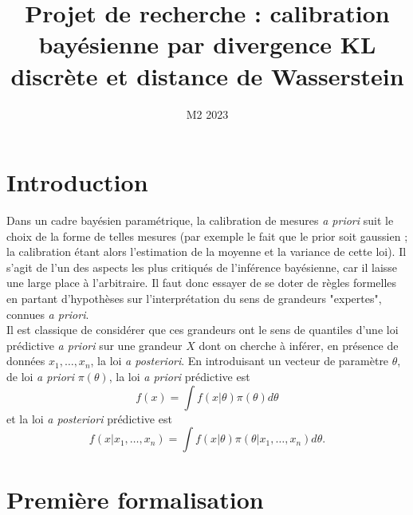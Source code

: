 \documentclass[10pt]{article}
\title{Projet de recherche : calibration bay\'esienne par divergence KL discr\`ete et distance de Wasserstein}
\date{M2 2023}
\newcommand{\1}{\mathbbm{1}}
\begin{document}
\maketitle

 
\section{Introduction}

Dans un cadre bay\'esien param\'etrique, la calibration de mesures {\it a priori} suit le choix de la forme de telles mesures (par exemple le fait que le prior soit gaussien ; la calibration \'etant alors l'estimation de la moyenne et la variance de cette loi). Il s'agit de l'un des aspects les plus critiqu\'es de l'inf\'erence bay\'esienne, car il laisse une large place \`a l'arbitraire. Il faut donc essayer de se doter de r\`egles formelles en partant d'hypoth\`eses sur l'interpr\'etation du sens de grandeurs "expertes", connues {\it a priori}. \\

Il est classique de consid\'erer que ces grandeurs ont le sens de quantiles d'une loi pr\'edictive {\it a priori} sur une grandeur $X$ dont on cherche \`a inf\'erer, en pr\'esence de donn\'ees $x_1,\ldots,x_n$, la loi {\it a posteriori}. En introduisant un vecteur de param\`etre $\theta$, de loi {\it a priori} $\pi(\theta)$, la loi {\it a priori} pr\'edictive est
$$
f(x)=\int f(x|\theta) \pi(\theta) d \theta
$$
et la loi {\it a posteriori} pr\'edictive est
$$
f(x|x_1,\ldots,x_n)=\int f(x|\theta) \pi(\theta|x_1,\ldots,x_n) d \theta.
$$

 

\section{Premi\`ere formalisation}
\end{document}
